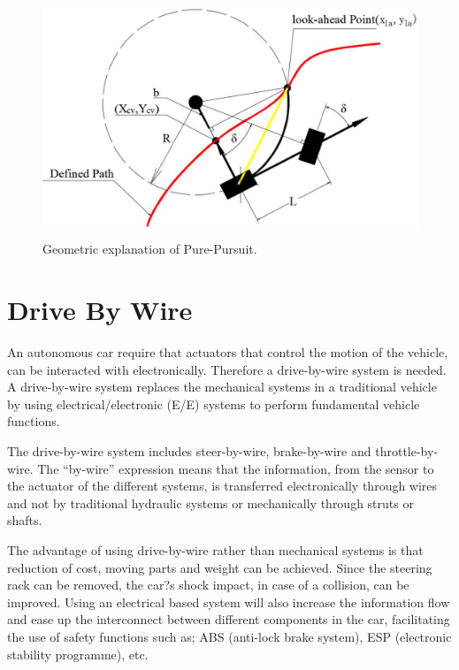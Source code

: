 \begin{figure}[h]
\centering
\includegraphics[height=2.8in]{figs/ch3/purepursuit}
\caption{Geometric explanation of Pure-Pursuit.}
\label{fig:purepursuit}
\end{figure}

\section{Drive By Wire}

An autonomous car require that actuators that control the motion of the vehicle, can be interacted with electronically. Therefore a drive-by-wire system is needed. A drive-by-wire system replaces the mechanical systems in a traditional vehicle by using electrical/electronic (E/E) systems to perform fundamental vehicle functions.

The drive-by-wire system includes steer-by-wire, brake-by-wire and throttle-by-wire. The ``by-wire'' expression means that the information, from the sensor to the actuator of the different systems, is transferred electronically through wires and not by traditional hydraulic systems or mechanically through struts or shafts.

The advantage of using drive-by-wire rather than mechanical systems is that reduction of cost, moving parts and weight can be achieved. Since the steering rack can be removed, the car?s shock impact, in case of a collision, can be improved. Using an electrical based system will also increase the information flow and ease up the interconnect between different components in the car, facilitating the use of safety functions such as; ABS (anti-lock brake system), ESP (electronic stability programme), etc.


%
%

